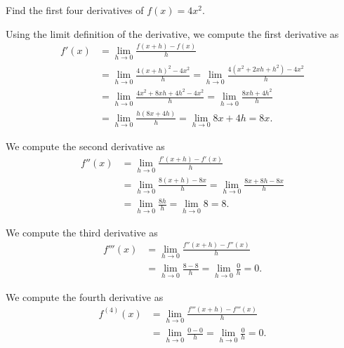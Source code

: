 \begin{example} \label{Ex:2.3.Eg3}
Find the first four derivatives of $f(x) = 4x^2$.

\solution Using the limit definition of the derivative, we compute the first derivative as
\begin{align*}
f'(x) & = \lim_{h \to 0} \frac{f(x+h) - f(x)}{h} \\
& = \lim_{h \to 0} \frac{4(x+h)^2 - 4x^2}{h} = \lim_{h \to 0} \frac{4(x^2 + 2xh + h^2) - 4x^2}{h} \\
&= \lim_{h \to 0} \frac{4x^2 + 8xh + 4h^2 - 4x^2}{h} = \lim_{h \to 0} \frac{8xh + 4h^2}{h} \\
&= \lim_{h \to 0} \frac{h(8x + 4h)}{h} = \lim_{h \to 0} 8x + 4h = 8x.
\end{align*}

We compute the second derivative as
\begin{align*}
f''(x) &= \lim_{h \to 0} \frac{f'(x+h) - f'(x)}{h} \\
&= \lim_{h \to 0} \frac{8(x+h) - 8x}{h} = \lim_{h \to 0} \frac{8x + 8h - 8x}{h} \\
&= \lim_{h \to 0} \frac{8h}{h} = \lim_{h \to 0} 8 = 8.
\end{align*}

We compute the third derivative as
\begin{align*}
f'''(x) &= \lim_{h \to 0} \frac{f''(x+h) - f''(x)}{h} \\
&= \lim_{h \to 0} \frac{8 - 8}{h} = \lim_{h \to 0} \frac{0}{h} = 0.
\end{align*}

We compute the fourth derivative as
\begin{align*}
f^{(4)}(x) &= \lim_{h \to 0} \frac{f'''(x+h) - f'''(x)}{h} \\
&= \lim_{h \to 0} \frac{0 - 0}{h} = \lim_{h \to 0} \frac{0}{h} = 0.
\end{align*}

\end{example}